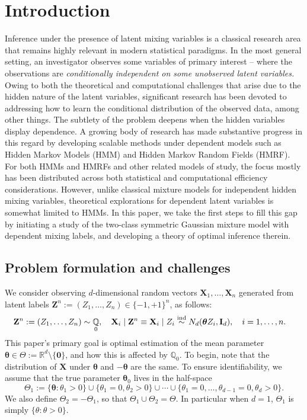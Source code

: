 \documentclass[preprint,reqno]{imsart}
\newcommand{\ttheta}{\boldsymbol{\theta}}
\newcommand{\I}{\mathbf{I}_{\mathnormal{d}}}
\DeclareMathOperator{\QQ}{\mathbb{Q}}
\newcommand{\Z}{\mathbf{Z}}
\newcommand{\X}{\mathbf{X}}
\begin{document}
\section{Introduction}
%
Inference under the presence of latent mixing variables is a classical research area that remains highly relevant in modern statistical paradigms. %
In the most general setting, an investigator observes %
some variables of primary interest  -- where the observations are \textit{conditionally independent on some unobserved latent variables.}  %
Owing to both the theoretical and computational challenges that arise due to the hidden nature of the latent variables, significant research has been devoted to addressing how to learn the conditional %
distribution of the observed data, among other things.  The subtlety of the problem deepens when the hidden variables display dependence.
%
A growing body of research has made substantive progress in this regard by developing scalable methods under dependent models such as Hidden Markov Models (HMM) and Hidden Markov Random Fields (HMRF). For both HMMs and HMRFs and other related models of study, the focus mostly has been distributed across both statistical and computational efficiency considerations. However, unlike classical mixture models for independent hidden mixing variables, theoretical explorations for dependent latent variables is somewhat limited %
to HMMs. In this paper, we take the first steps to fill this gap by initiating a study of the two-class symmetric Gaussian mixture model with dependent mixing labels, and developing a theory of optimal inference therein. 


%
%

\subsection{Problem formulation and challenges} 
We consider observing $d$-dimensional random vectors $\X_1,\ldots,\X_n$ generated from latent labels $ \Z^n := (Z_1, \ldots, Z_n)\in \{-1,+1\}^n$, as follows:
%
\begin{equation}\label{eq:model}
\begin{aligned}
    \Z^n := (Z_1, \ldots, Z_n) \sim \QQ_{0}, \quad \X_i \mid \Z^n \equiv \X_i \mid Z_i &\overset{\text{ind}}{\sim} N_d(\ttheta Z_i, \I), \quad i = 1, \ldots, n.
\end{aligned}
\end{equation}
%
%
This paper's primary goal is optimal estimation of the %
mean parameter $\ttheta \in \Theta := \mathbb{R}^d \setminus \{\mathbf{0}\}$, and how this is affected by $\mathbb{Q}_0$. 
%
%
To begin, note that the distribution of $\X$ under $\ttheta$ and $-\ttheta$ are the same. %
%
To ensure identifiability, we assume that the true parameter $\ttheta_0$ lives in the half-space $$\Theta_1 := \{\ttheta: \theta_1 > 0\} \cup \{\theta_1 = 0, \theta_2 > 0 \} \cup \cdots \cup \{\theta_1 = 0, \ldots, \theta_{d-1} = 0, \theta_d > 0 \}.$$ We also define $\Theta_2 = - \Theta_1$, so that $\Theta_1 \cup \Theta_2 = \Theta$.
%
In particular when $d = 1$, $\Theta_1$ is simply $\{\theta: \theta> 0 \}$.
%
%
\end{document}
